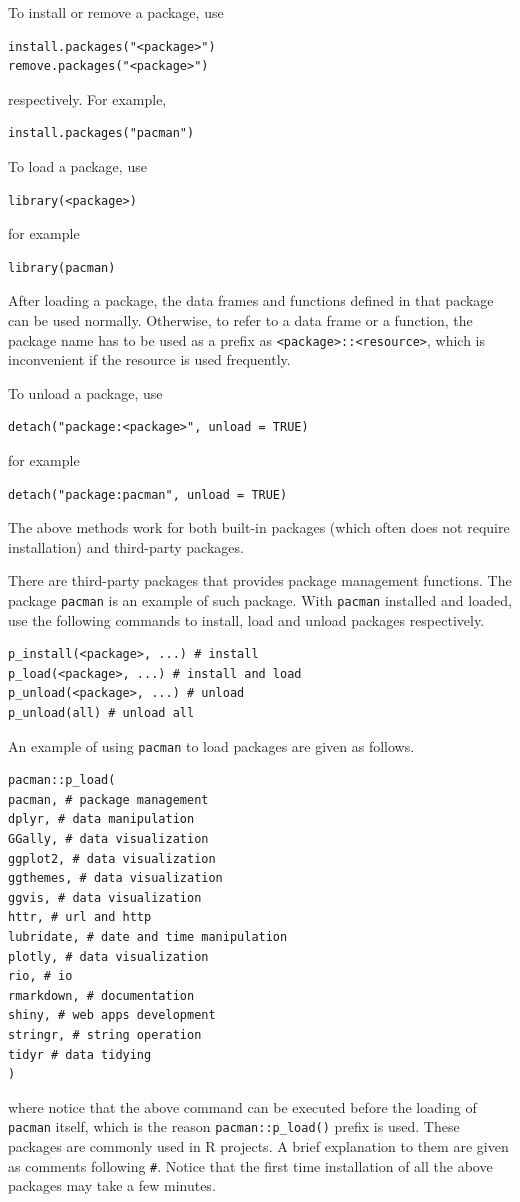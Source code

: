 To install or remove a package, use
\begin{lstlisting}
install.packages("<package>")
remove.packages("<package>")
\end{lstlisting}
respectively. For example,
\begin{lstlisting}
install.packages("pacman")
\end{lstlisting}

To load a package, use
\begin{lstlisting}
library(<package>)
\end{lstlisting}
for example
\begin{lstlisting}
library(pacman)
\end{lstlisting}
After loading a package, the data frames and functions defined in that package can be used normally. Otherwise, to refer to a data frame or a function, the package name has to be used as a prefix as \verb|<package>::<resource>|, which is inconvenient if the resource is used frequently.

To unload a package, use
\begin{lstlisting}
detach("package:<package>", unload = TRUE)
\end{lstlisting}
for example
\begin{lstlisting}
detach("package:pacman", unload = TRUE)
\end{lstlisting}

The above methods work for both built-in packages (which often does not require installation) and third-party packages.

There are third-party packages that provides package management functions. The package \verb|pacman| is an example of such package. With \verb|pacman| installed and loaded, use the following commands to install, load and unload packages respectively.
\begin{lstlisting}
p_install(<package>, ...) # install
p_load(<package>, ...) # install and load
p_unload(<package>, ...) # unload
p_unload(all) # unload all
\end{lstlisting}
An example of using \verb|pacman| to load packages are given as follows.
\begin{lstlisting}
pacman::p_load(
pacman, # package management
dplyr, # data manipulation
GGally, # data visualization
ggplot2, # data visualization
ggthemes, # data visualization
ggvis, # data visualization
httr, # url and http
lubridate, # date and time manipulation
plotly, # data visualization
rio, # io
rmarkdown, # documentation
shiny, # web apps development
stringr, # string operation
tidyr # data tidying
)
\end{lstlisting}
where notice that the above command can be executed before the loading of \verb|pacman| itself, which is the reason \verb|pacman::p_load()| prefix is used. These packages are commonly used in R projects. A brief explanation to them are given as comments following \verb|#|. Notice that the first time installation of all the above packages may take a few minutes.

